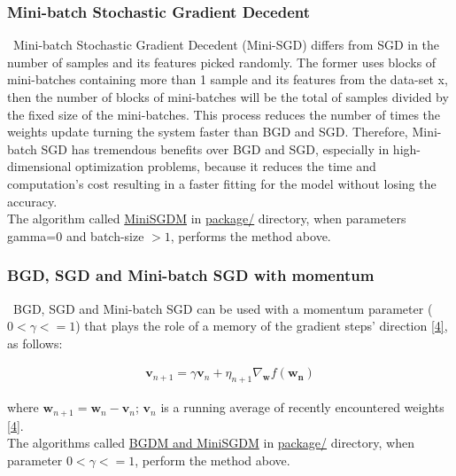 \subsubsection{Mini-batch Stochastic Gradient Decedent}
\label{chap:Mini-batch Stochastic Gradient Decedent}

\quad \, Mini-batch Stochastic Gradient Decedent (Mini-SGD) differs from SGD in the number of samples and its features picked randomly. The former uses blocks of mini-batches containing more than 1 sample and its features from the data-set x, then the number of blocks of mini-batches will be the total of samples divided by the fixed size of the mini-batches. This process reduces the number of times the weights update turning the system faster than BGD and SGD. Therefore, Mini-batch SGD has tremendous benefits over BGD and SGD, especially in high-dimensional optimization problems, because it reduces the time and computation's cost resulting in a faster fitting for the model without losing the accuracy.\\

The algorithm called \href{https://github.com/fabiorodp/UiO-FYS-STK4155/blob/master/Project2/package/gradient_descent.py}{MiniSGDM} in \href{https://github.com/fabiorodp/UiO-FYS-STK4155/blob/master/Project2/package/}{package/} directory, when parameters gamma=0 and batch-size $> 1$, performs the method above.

\subsubsection{BGD, SGD and Mini-batch SGD with momentum}
\label{chap:BGD, SGD and Mini-batch SGD with momentum}

\quad \, BGD, SGD and Mini-batch SGD can be used with a momentum parameter ($0 < \gamma <= 1$) that plays the role of a memory of the gradient steps' direction \hyperref[Bib:Week40Notes]{[4]}, as follows:

\begin{align*}
\boldsymbol{v}_{n+1} = \gamma \boldsymbol{v}_{n} + \eta_{n+1} \nabla_{\boldsymbol{w}} f(\boldsymbol{w_{n}})
\end{align*}

\noindent where $\boldsymbol{w}_{n+1} = \boldsymbol{w}_{n} - \boldsymbol{v}_{n}$; $\boldsymbol{v}_{n}$ is a running average of recently encountered weights \hyperref[Bib:Week40Notes]{[4]}.\\

The algorithms called \href{https://github.com/fabiorodp/UiO-FYS-STK4155/blob/master/Project2/package/gradient_descent.py}{BGDM and MiniSGDM} in \href{https://github.com/fabiorodp/UiO-FYS-STK4155/blob/master/Project2/package/}{package/} directory, when parameter $0 < \gamma <= 1$, perform the method above.


